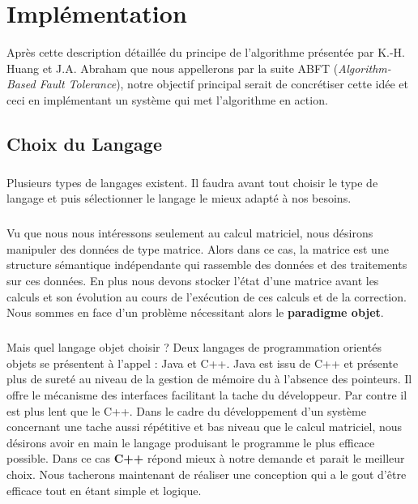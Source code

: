 \documentclass[a4paper, 10pt]{report}
\begin{document}
\chapter{Implémentation}
Après cette description détaillée du principe de l’algorithme présentée par K.-H. Huang et J.A. Abraham que nous 
appellerons par la suite ABFT (\textit{Algorithm-Based Fault Tolerance}), notre objectif principal serait de 
concrétiser cette idée et ceci en implémentant un système qui met l’algorithme en action.
\section{Choix du Langage}
\paragraph*{}
Plusieurs types de langages existent. Il faudra avant tout choisir le type de langage et puis sélectionner le langage 
le mieux adapté à nos besoins.
\paragraph*{}
Vu que nous nous intéressons seulement au calcul matriciel, nous désirons manipuler des données de type matrice. 
Alors dans ce cas, la matrice est une structure sémantique indépendante qui rassemble des données et des traitements 
sur ces données. En plus nous devons stocker l’état d’une matrice avant les calculs et son évolution au cours de 
l’exécution de ces calculs et de la correction. Nous sommes en face d’un problème nécessitant alors le \textbf{paradigme objet}.
\paragraph*{}
Mais quel langage objet choisir ? Deux langages de programmation orientés objets se présentent à l’appel : Java et C++. 
Java est issu de C++ et présente plus de sureté au niveau de la gestion de mémoire du à l’absence des pointeurs. 
Il offre le mécanisme des interfaces facilitant la tache du développeur. Par contre il est plus lent que le C++. 
Dans le cadre du développement d’un système concernant une tache aussi répétitive et bas niveau que le calcul matriciel, 
nous désirons avoir en main le langage produisant le programme le plus efficace possible. Dans ce cas \textbf{C++} répond mieux 
à notre demande et parait le meilleur choix. Nous tacherons maintenant de réaliser 
une conception qui a le gout d’être efficace tout en étant simple et logique.
\end{document}
